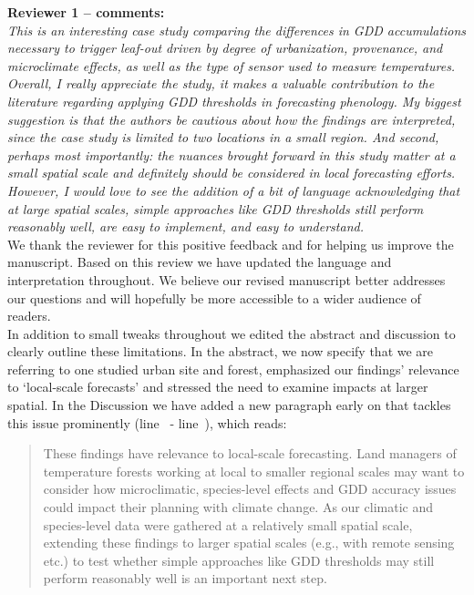 \documentclass[11pt,a4paper]{article}\usepackage[]{graphicx}\usepackage[]{color}
\newcommand{\lr}[1]{line~\lineref{#1}}
\begin{document}
\textbf {Reviewer 1 -- comments:} \\

\textit{This is an interesting case study comparing the differences in GDD accumulations necessary to trigger leaf-out driven by degree of urbanization, provenance, and microclimate effects, as well as the type of sensor used to measure temperatures. Overall, I really appreciate the study, it makes a valuable contribution to the literature regarding applying GDD thresholds in forecasting phenology. My biggest suggestion is that the authors be cautious about how the findings are interpreted, since the case study is limited to two locations in a small region. And second, perhaps most importantly: the nuances brought forward in this study matter at a small spatial scale and definitely should be considered in local forecasting efforts. However, I would love to see the addition of a bit of language acknowledging that at large spatial scales, simple approaches like GDD thresholds still perform reasonably well, are easy to implement, and easy to understand.} \\

We thank the reviewer for this positive feedback and for helping us improve the manuscript. Based on this review we have updated the language and interpretation throughout. We believe our revised manuscript better addresses our questions and will hopefully be more accessible to a wider audience of readers. \\

In addition to small tweaks throughout we edited the abstract and discussion to clearly outline these limitations. In the abstract, we now specify that we are referring to one studied urban site and forest, emphasized our findings' relevance to `local-scale forecasts' and stressed the need to examine impacts at larger spatial. In the Discussion we have added a new paragraph early on that tackles this issue prominently (\lr{Z1largespatialscale} - \lr{Z1scaleend}), which reads: \\

\begin{quotation}
\noindent These findings have relevance to local-scale forecasting. Land managers of temperature forests working at local to smaller regional scales may want to consider how microclimatic, species-level effects and GDD accuracy issues could impact their planning with climate change. As our climatic and species-level data were gathered at a relatively small spatial scale, extending these findings to larger spatial scales (e.g., with remote sensing etc.) to test whether simple approaches like GDD thresholds may still perform reasonably well is an important next step.
\end{quotation}
\end{document}
